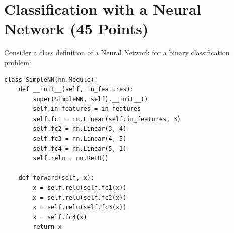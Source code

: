 \documentclass[12pt, xcolor=dvipsnames,svgnames,x11names]{article}
\begin{document}
\section{Classification with a Neural Network (45 Points)}


Consider a class definition of a Neural Network for a binary classification problem:

\begin{verbatim}
class SimpleNN(nn.Module):
    def __init__(self, in_features):
        super(SimpleNN, self).__init__()
        self.in_features = in_features
        self.fc1 = nn.Linear(self.in_features, 3)
        self.fc2 = nn.Linear(3, 4)
        self.fc3 = nn.Linear(4, 5)
        self.fc4 = nn.Linear(5, 1)
        self.relu = nn.ReLU()

    def forward(self, x):
        x = self.relu(self.fc1(x))
        x = self.relu(self.fc2(x))
        x = self.relu(self.fc3(x))
        x = self.fc4(x)
        return x

\end{verbatim}
\end{document}
